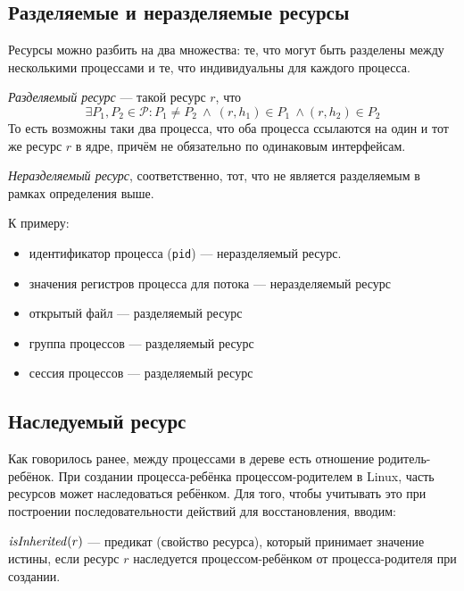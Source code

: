 \subsection{Разделяемые и неразделяемые ресурсы}

Ресурсы можно разбить на два множества: те, что могут быть разделены между несколькими процессами и те, что индивидуальны для каждого процесса.

\begin{defn}
\emph{Разделяемый ресурс} --- такой ресурс $r$, что
\begin{equation*}
\exists P_1, P_2 \in \mathcal{P}: P_1 \neq P_2\ \land\ (r, h_1) \in P_1\ \land (r, h_2) \in P_2
\end{equation*}
 То есть возможны таки два процесса, что оба процесса ссылаются на один и тот же ресурс $r$ в ядре, причём не обязательно по одинаковым интерфейсам.
\end{defn}

\emph{Неразделяемый ресурс}, соответственно, тот, что не является разделяемым в рамках определения выше.

К примеру: 
\begin{itemize}
	\item идентификатор процесса (\texttt{pid}) --- неразделяемый ресурс.
	\item значения регистров процесса для потока --- неразделяемый ресурс
	\item открытый файл --- разделяемый ресурс
	\item группа процессов --- разделяемый ресурс
	\item сессия процессов --- разделяемый ресурс
\end{itemize}

\subsection{Наследуемый ресурс}
\label{subsec:inherres}

Как говорилось ранее, между процессами в дереве есть отношение родитель-ребёнок. При создании процесса-ребёнка процессом-родителем в Linux, часть ресурсов может наследоваться ребёнком. Для того, чтобы учитывать это при построении последовательности действий для восстановления, вводим:

\begin{defn}
\label{def:isinherited}
$\text{\textit{isInherited}}(r)$ --- предикат (свойство ресурса), который принимает значение истины, если ресурс $r$ наследуется процессом-ребёнком от процесса-родителя при создании.
\end{defn}

